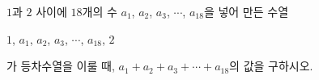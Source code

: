 $1$과 $2$ 사이에 $18$개의 수 $a_1$, $a_2$, $a_3$, $\cdots$, $a_{18}$을 넣어 만든 수열 \par\smallskip\noindent\hspace*{1.5em}$1$, $a_1$, $a_2$, $a_3$, $\cdots$, $a_{18}$, $2$\par\smallskip\noindent 가 등차수열을 이룰 때, $a_1+a_2+a_3+\cdots+a_{18}$의 값을 구하시오.
